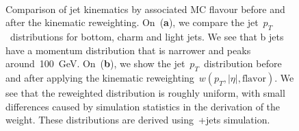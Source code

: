 \begin{figure}
\begin{centering}
 \\
\caption[Comparison of jet kinematics in MC simulation by jet flavour]{Comparison of jet kinematics by associated MC flavour before and after the kinematic reweighting. On~(\textbf{a}), we compare the jet~$p_T$~distributions for bottom, charm and light jets. We see that b jets have a momentum distribution that is narrower and peaks around~100~GeV. On~(\textbf{b}), we show the jet~$p_T$~distribution before and after applying the kinematic reweighting~$w(p_T,|\eta|,\mathrm{flavor})$. We see that the reweighted distribution is roughly uniform, with small differences caused by simulation statistics in the derivation of the weight. These distributions are derived using~\ttbar+jets simulation.}
\label{fig:btag_pt_reweight}
\end{centering}
\end{figure}

